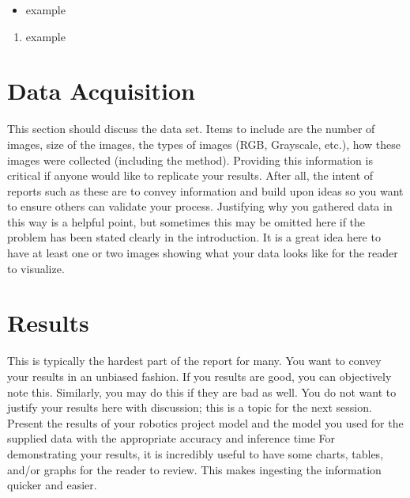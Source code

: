 \documentclass[10pt,journal,compsoc]{IEEEtran}
\begin{document}
		
		\begin{itemize}
			\item example
			\end {itemize}
			
			
			
			\begin{enumerate}
				\item example
				
			\end{enumerate}
			
		\section{Data Acquisition}
		This section should discuss the data set. Items to include are the number of images, size of the images, the types of images (RGB, Grayscale, etc.), how these images were collected (including the method). Providing this information is critical if anyone would like to replicate your results. After all, the intent of reports such as these are to convey information and build upon ideas so you want to ensure others can validate your process.
		Justifying why you gathered data in this way is a helpful point, but sometimes this may be omitted here if the problem has been stated clearly in the introduction.
		It is a great idea here to have at least one or two images showing what your data looks like for the reader to visualize.
			
		\section{Results}
		This is typically the hardest part of the report for many. You want to convey your results in an unbiased fashion. If you results are good, you can objectively note this. Similarly, you may do this if they are bad as well. You do not want to justify your results here with discussion; this is a topic for the next session. 
		Present the results of your robotics project model and the model you used for the supplied data with the appropriate accuracy and inference time
		For demonstrating your results, it is incredibly useful to have some charts, tables, and/or graphs for the reader to review. This makes ingesting the information quicker and easier.
			
\end{document}
